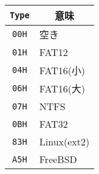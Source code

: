 \documentclass{standalone}
\begin{document}
\begin{tabular}{c|l}\hline\hline
  \texttt{Type} & \multicolumn{1}{c}{意味} \\\hline
  \texttt{00H}  & 空き      \\
  \texttt{01H}  & FAT12     \\
  \texttt{04H}  & FAT16(小) \\
  \texttt{06H}  & FAT16(大) \\
  \texttt{07H}  & NTFS      \\
  \texttt{0BH}  & FAT32     \\
  \texttt{83H}  & Linux(ext2) \\
  \texttt{A5H}  & FreeBSD   \\
\end{tabular}
\end{document}
